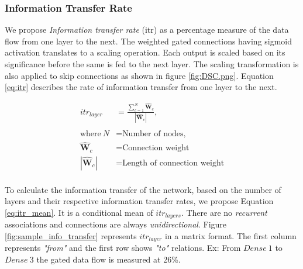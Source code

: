 \documentclass{article}
\let\oldhat\hat
\renewcommand{\hat}[1]{\oldhat{\mathbf{#1}}}
\begin{document}
\par
\bigskip

\subsubsection{Information Transfer Rate}
\label{sub:InfoTransfer}
We propose \emph{Information transfer rate} (itr) as a percentage measure of the data flow from one layer to the next. The weighted gated connections having sigmoid activation translates to a scaling operation. Each output is scaled based on its significance before the same is fed to the next layer. The scaling transformation is also applied to skip connections as shown in figure \ref{fig:DSC.png}. Equation \ref{eq:itr} describes the rate of information transfer from one layer to the next. 

    \begin{equation}
    \label{eq:itr}
    \begin{aligned}
    itr_{layer} &=\frac{\sum_{c=1}^{N}\hat{W}_{c}}{|\hat{W}_{c}|}, \\
    \\
    \text{where}~N &= \text{Number of nodes,} \\
    \hat{W}_{c} &= \text{Connection weight}\\
    |\hat{W}_{c}| &= \text{Length of connection weight}\\
\end{aligned}
\end{equation}

To calculate the information transfer of the network, based on the number of layers and their respective information transfer rates, we propose Equation \ref{eq:itr_mean}.  It is a conditional mean of ${itr_{layers}}$. There are no \emph{recurrent} associations and connections are always \emph{unidirectional}. Figure \ref{fig:sample_info_transfer} represents ${itr_{layer}}$ in a matrix format. The first column represents \emph{"from"} and the first row shows \emph{"to"} relations. Ex: From $Dense\>1$ to $Dense\>3$ the gated data flow is measured at 26\%.
\end{document}
